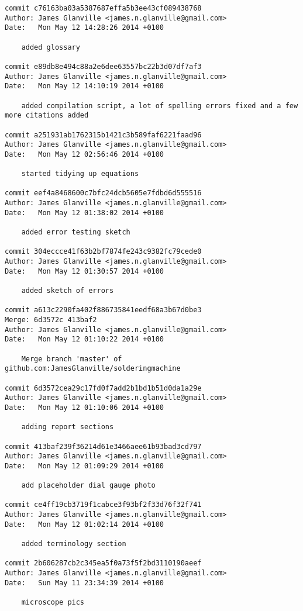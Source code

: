 \documentclass[a4paper,11pt]{article}  %
\begin{document}
\begin{lstlisting}[frame=single]
commit c76163ba03a5387687effa5b3ee43cf089438768
Author: James Glanville <james.n.glanville@gmail.com>
Date:   Mon May 12 14:28:26 2014 +0100

    added glossary

commit e89db8e494c88a2e6dee63557bc22b3d07df7af3
Author: James Glanville <james.n.glanville@gmail.com>
Date:   Mon May 12 14:10:19 2014 +0100

    added compilation script, a lot of spelling errors fixed and a few more citations added

commit a251931ab1762315b1421c3b589faf6221faad96
Author: James Glanville <james.n.glanville@gmail.com>
Date:   Mon May 12 02:56:46 2014 +0100

    started tidying up equations

commit eef4a8468600c7bfc24dcb5605e7fdbd6d555516
Author: James Glanville <james.n.glanville@gmail.com>
Date:   Mon May 12 01:38:02 2014 +0100

    added error testing sketch

commit 304eccce41f63b2bf7874fe243c9382fc79cede0
Author: James Glanville <james.n.glanville@gmail.com>
Date:   Mon May 12 01:30:57 2014 +0100

    added sketch of errors

commit a613c2290fa402f886735841eedf68a3b67d0be3
Merge: 6d3572c 413baf2
Author: James Glanville <james.n.glanville@gmail.com>
Date:   Mon May 12 01:10:22 2014 +0100

    Merge branch 'master' of github.com:JamesGlanville/solderingmachine

commit 6d3572cea29c17fd0f7add2b1bd1b51d0da1a29e
Author: James Glanville <james.n.glanville@gmail.com>
Date:   Mon May 12 01:10:06 2014 +0100

    adding report sections

commit 413baf239f36214d61e3466aee61b93bad3cd797
Author: James Glanville <james.n.glanville@gmail.com>
Date:   Mon May 12 01:09:29 2014 +0100

    add placeholder dial gauge photo

commit ce4ff19cb3719f1cabce3f93bf2f33d76f32f741
Author: James Glanville <james.n.glanville@gmail.com>
Date:   Mon May 12 01:02:14 2014 +0100

    added terminology section

commit 2b606287cb2c345ea5f0a73f5f2bd3110190aeef
Author: James Glanville <james.n.glanville@gmail.com>
Date:   Sun May 11 23:34:39 2014 +0100

    microscope pics


\end{lstlisting}
\end{document}
